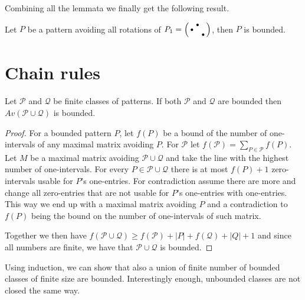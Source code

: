 Combining all the lemmata we finally get the following result.

\begin{thm}
Let $P$ be a pattern avoiding all rotations of $P_1=\left(\begin{smallmatrix} &\bullet& \\\bullet& & \\ & &\bullet\end{smallmatrix}\right)$, then $P$ is bounded.
\end{thm}

\section{Chain rules}
\begin{thm}
\label{boundunion}
Let $\mathcal{P}$ and $\mathcal{Q}$ be finite classes of patterns. If both $\mathcal{P}$ and $\mathcal{Q}$ are bounded then $Av(\mathcal{P}\cup\mathcal{Q})$ is bounded.
\end{thm}
\begin{proof}
For a bounded pattern $P$, let $f(P)$ be a bound of the number of one-intervals of any maximal matrix avoiding $P$. For $\mathcal{P}$ let $f(\mathcal{P})=\sum_{P\in\mathcal{P}}f(P)$. Let $M$ be a maximal matrix avoiding $\mathcal{P}\cup\mathcal{Q}$ and take the line with the highest number of one-intervals. For every $P\in\mathcal{P}\cup\mathcal{Q}$ there is at most $f(P)+1$ zero-intervals usable for $P$'s one-entries. For contradiction assume there are more and change all zero-entries that are not usable for $P$'s one-entries with one-entries. This way we end up with a maximal matrix avoiding $P$ and a contradiction to $f(P)$ being the bound on the number of one-intervals of such matrix.

Together we then have $f(\mathcal{P}\cup\mathcal{Q})\geq f(\mathcal{P})+|P|+f(\mathcal{Q})+|Q|+1$ and since all numbers are finite, we have that $\mathcal{P}\cup\mathcal{Q}$ is bounded.
\end{proof}
Using induction, we can show that also a union of finite number of bounded classes of finite size are bounded. Interestingly enough, unbounded classes are not closed the same way.

